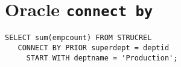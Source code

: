 \section{Oracle \texttt{connect by}}



\begin{verbatim}
SELECT sum(empcount) FROM STRUCREL
   CONNECT BY PRIOR superdept = deptid
     START WITH deptname = 'Production';
\end{verbatim}
